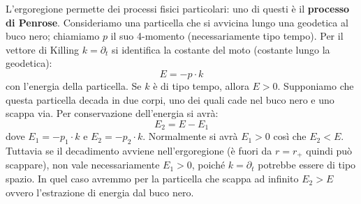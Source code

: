 L'ergoregione permette dei processi fisici particolari: uno di questi è il \textbf{processo di Penrose}.
Consideriamo una particella che si avvicina lungo una geodetica al buco nero; chiamiamo $p$ il suo 4-momento (necessariamente tipo tempo). Per il vettore di Killing $k = \partial_t$ si identifica la costante del moto (costante lungo la geodetica):
\begin{equation*}
    E = - p\cdot k
\end{equation*}
con l'energia della particella. Se $k$ è di tipo tempo, allora $E>0$. Supponiamo che questa particella decada in due corpi, uno dei quali cade nel buco nero e uno scappa via. Per conservazione dell'energia si avrà:
\begin{equation*}
    E_2 = E - E_1
\end{equation*}
dove $E_1 = - p_1 \cdot k$ e $E_2 = - p_2 \cdot k$. Normalmente si avrà $E_1 > 0$ così che $E_2 < E$. Tuttavia se il decadimento avviene nell'ergoregione (è fuori da $r=r_+$ quindi può scappare), non vale necessariamente $E_1 > 0$, poiché $k = \partial_t$ potrebbe essere di tipo spazio. In quel caso avremmo per la particella che scappa ad infinito $E_2 > E$ ovvero l'estrazione di energia dal buco nero.

